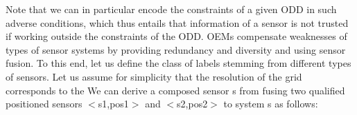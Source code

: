 Note that we can in particular encode the constraints of a given ODD in such adverse conditions, which thus entails that information of a sensor is not trusted if working outside the constraints of the ODD. OEMs compensate weaknesses of types of sensor systems by providing redundancy and diversity and using sensor fusion. To this end, let us define the class of labels stemming from different types of sensors. Let us assume for simplicity that the resolution of the grid corresponds to the  
We can derive a composed sensor s from fusing two qualified positioned sensors $<$s1,pos1$>$  and $<$s2,pos2$>$ to system s as follows:
%
